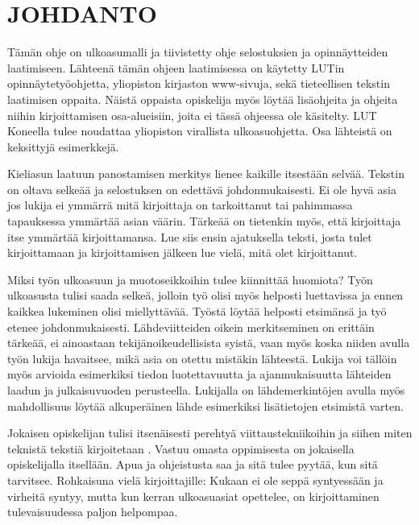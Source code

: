 \documentclass{LUT_pohja}[2016/03/09 LUT Dippa Pohja]
\begin{document}
\newpage
\section{JOHDANTO}
Tämän ohje on ulkoasumalli ja tiivistetty ohje selostuksien ja opinnäytteiden laatimiseen. 
Lähteenä tämän ohjeen laatimisessa on käytetty LUTin opinnäytetyöohjetta, yliopiston 
kirjaston www-sivuja, sekä tieteellisen tekstin laatimisen oppaita. Näistä oppaista 
opiskelija myös löytää lisäohjeita ja ohjeita niihin kirjoittamisen osa-alueisiin, joita ei tässä ohjeessa ole käsitelty. LUT Koneella tulee noudattaa yliopiston virallista ulkoasuohjetta. Osa lähteistä on keksittyjä esimerkkejä. \par

Kieliasun laatuun panostamisen merkitys lienee kaikille itsestään selvää. Tekstin on oltava selkeää ja selostuksen on edettävä johdonmukaisesti. Ei ole hyvä asia jos lukija ei ymmärrä mitä kirjoittaja on tarkoittanut tai pahimmassa tapauksessa ymmärtää asian väärin. Tärkeää on tietenkin myös, että kirjoittaja itse ymmärtää kirjoittamansa. Lue siis ensin ajatuksella teksti, josta tulet kirjoittamaan ja kirjoittamisen jälkeen lue vielä, mitä olet kirjoittanut.\par 

Miksi työn ulkoasuun ja muotoseikkoihin tulee kiinnittää huomiota? Työn ulkoasusta tulisi saada selkeä, jolloin työ olisi myös helposti luettavissa ja ennen kaikkea lukeminen olisi miellyttävää.  Työstä löytää helposti etsimänsä  ja työ  etenee  johdonmukaisesti. Lähdeviitteiden  oikein  merkitseminen  on  erittäin  tärkeää,  ei  ainoastaan tekijänoikeudellisista syistä, vaan myös koska niiden avulla työn lukija havaitsee, mikä asia on otettu mistäkin lähteestä. Lukija voi tällöin myös arvioida esimerkiksi tiedon luotettavuutta ja ajanmukaisuutta lähteiden laadun ja julkaisuvuoden perusteella. Lukijalla on lähdemerkintöjen avulla myös mahdollisuus löytää alkuperäinen lähde esimerkiksi lisätietojen etsimistä varten.\par

Jokaisen opiskelijan tulisi itsenäisesti perehtyä viittaustekniikoihin ja siihen miten teknistä tekstiä kirjoitetaan \citep{Pakkanen05}. Vastuu omasta oppimisesta on jokaisella opiskelijalla itsellään. Apua ja ohjeistusta saa ja sitä tulee pyytää, kun sitä tarvitsee. Rohkaisuna vielä kirjoittajille: Kukaan ei ole seppä syntyessään ja virheitä syntyy, mutta kun kerran ulkoasuasiat opettelee, on kirjoittaminen tulevaisuudessa paljon helpompaa. \citep{Viittaaminen07}
\newpage
\end{document}
